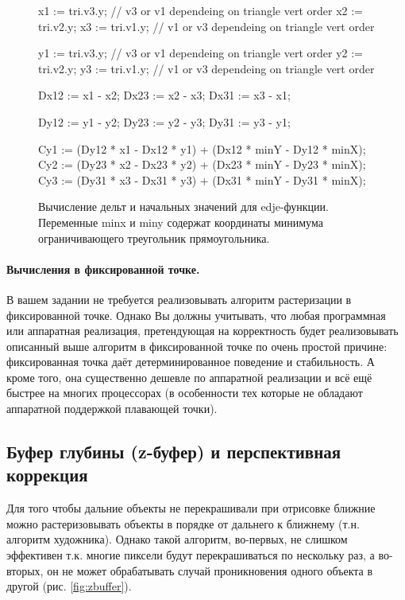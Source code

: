 \documentclass[12pt,subf,href,colorlinks=true]{article}
\begin{document}
\begin{figure}[h]
	\begin{algorithmic}[1]
		
	 \State x1 := tri.v3.y; // v3 or v1 dependeing on triangle vert order
	 \State x2 := tri.v2.y;
	 \State x3 := tri.v1.y; // v1 or v3 dependeing on triangle vert order
	 
	 \State y1 := tri.v3.y; // v3 or v1 dependeing on triangle vert order
	 \State y2 := tri.v2.y; 
	 \State y3 := tri.v1.y; // v1 or v3 dependeing on triangle vert order

     \State Dx12 := x1 - x2;
     \State Dx23 := x2 - x3;
     \State Dx31 := x3 - x1;
     
     \State Dy12 := y1 - y2;
     \State Dy23 := y2 - y3;
     \State Dy31 := y3 - y1;
     
     \State Cy1 := (Dy12 * x1 - Dx12 * y1) + (Dx12 * minY - Dy12 * minX);
	 \State Cy2 := (Dy23 * x2 - Dx23 * y2) + (Dx23 * minY - Dy23 * minX);
	 \State Cy3 := (Dy31 * x3 - Dx31 * y3) + (Dx31 * minY - Dy31 * minX);
		
	\end{algorithmic}
	\caption{Вычисление дельт и начальных значений для edje-функции. Переменные minx и miny содержат координаты минимума ограничивающего треугольник прямоугольника. }\label{alg:halfspace2}
\end{figure}

\FloatBarrier

\paragraph{Вычисления в фиксированной точке.} В вашем задании не требуется реализовывать алгоритм растеризации в фиксированной точке. Однако Вы должны учитывать, что любая программная или аппаратная реализация, претендующая на корректность будет реализовывать описанный выше алгоритм в фиксированной точке по очень простой причине: фиксированная точка даёт детерминированное поведение и стабильность. А кроме того, она существенно дешевле по аппаратной реализации и всё ещё быстрее на многих процессорах (в особенности тех которые не обладают аппаратной поддержкой плавающей точки). 

\subsection{Буфер глубины (z-буфер) и перспективная коррекция}

Для того чтобы дальние объекты не перекрашивали при отрисовке ближние можно растеризовывать объекты в порядке от дальнего к ближнему (т.н. алгоритм художника). Однако такой алгоритм, во-первых, не слишком эффективен т.к. многие пиксели будут перекрашиваться по нескольку раз, а во-вторых, он не может обрабатывать случай проникновения одного объекта в другой (рис. \ref{fig:zbuffer}).
\end{document}
